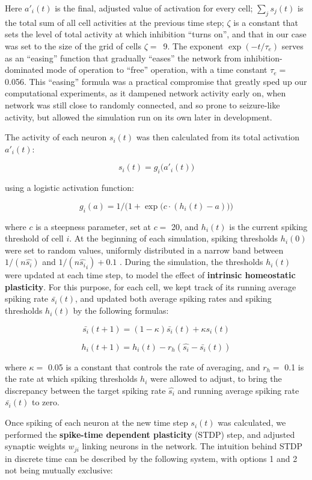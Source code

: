 \documentclass{article}
\begin{document}
Here $a'_i(t)$ is the final, adjusted value of activation for every cell; $\sum_j{s_j(t)}$ is the total sum of all cell activities at the previous time step; $\zeta$ is a constant that sets the level of total activity at which inhibition “turns on”, and that in our case was set to the size of the grid of cells \mbox{$\zeta=$ 9}. The exponent $\exp(-t/\tau_e)$ serves as an “easing” function that gradually “eases” the network from inhibition-dominated mode of operation to “free” operation, with a time constant $\tau_e=$ 0.056. This “easing” formula was a practical compromise that greatly sped up our computational experiments, as it dampened network activity early on, when network was still close to randomly connected, and so prone to seizure-like activity, but allowed the simulation run on its own later in development.

The activity of each neuron $s_i(t)$ was then calculated from its total activation $a'_i(t)$:

\[ s_i(t) = g_i\big(a'_i(t)\big) \]

using a logistic activation function: 

\[ g_i(a) = 1/\Big(1+\exp\big(c\cdot(h_i(t)-a)\big)\Big) \]

where $c$ is a steepness parameter, set at $c=$ 20, and $h_i(t)$ is the current spiking threshold of cell $i$. At the beginning of each simulation, spiking thresholds $h_i(0)$ were set to random values, uniformly distributed in a narrow band between $1/(n \hat{s_i})$ and $1/(n \hat{s_i}_i)+0.1$ . During the simulation, the thresholds $h_i(t)$ were updated at each time step, to model the effect of \textbf{intrinsic homeostatic plasticity}. For this purpose, for each cell, we kept track of its running average spiking rate $\bar{s_i}(t)$, and updated both average spiking rates and spiking thresholds $h_i(t)$ by the following formulas:

\[ \bar{s_i}(t+1) = (1-\kappa)\bar{s_i}(t) + \kappa s_i(t) \]

\[ h_i(t+1) = h_i(t) - r_h(\hat{s_i} - \bar{s_i}(t)) \]

where $\kappa=$ 0.05 is a constant that controls the rate of averaging, and $r_h=$ 0.1 is the rate at which spiking thresholds $h_i$ were allowed to adjust, to bring the discrepancy between the target spiking rate $\hat{s_i}$ and running average spiking rate $\bar{s_i}(t)$ to zero.

Once spiking of each neuron at the new time step $s_i(t)$ was calculated, we performed the \textbf{spike-time dependent plasticity} (STDP) step, and adjusted synaptic weights $w_{ji}$ linking neurons in the network. The intuition behind STDP in discrete time can be described by the following system, with options 1 and 2 not being mutually exclusive:
\end{document}
